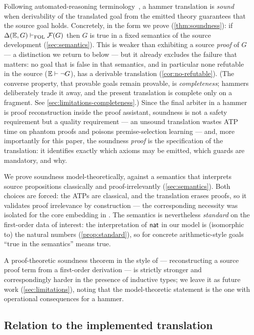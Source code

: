 Following automated-reasoning terminology~\cite{Czajka2018,
BlanchetteEtAl2016}, a hammer translation is \emph{sound} when derivability
of the translated goal from the emitted theory guarantees that the source
goal holds.  Concretely, in the form we prove (\cref{thm:soundness}): if
$\Delta(\mathbb{E},G) \vdash_{\mathrm{FOL}} \mathcal{F}(G)$ then $G$ is true in a fixed semantics of the source
development (\cref{sec:semantics}).  This is weaker than exhibiting a source
\emph{proof} of $G$ --- a distinction we return to below --- but it already
excludes the failure that matters: no goal that is false in that semantics,
and in particular none refutable in the source ($\mathbb{E} \vdash \neg G$), has a
derivable translation (\cref{cor:no-refutable}).  (The converse property,
that provable
goals remain provable, is \emph{completeness}; hammers deliberately trade
it away, and the present translation is complete only on a fragment.  See
\cref{sec:limitations-completeness}.)  Since the final arbiter in a hammer
is proof reconstruction inside the proof assistant, soundness is not a
safety requirement but a quality requirement --- an unsound translation
wastes ATP time on phantom proofs and poisons premise-selection learning
\cite{BlanchetteEtAl2016qed} --- and, more importantly for this paper, the
soundness \emph{proof} is the specification of the translation: it
identifies exactly which axioms may be emitted, which guards are mandatory,
and why.

We prove soundness model-theoretically, against a semantics that interprets
source propositions classically and proof-irrelevantly
(\cref{sec:semantics}).  Both choices are forced: the ATPs are classical,
and the translation erases proofs, so it validates proof irrelevance by
construction --- the corresponding necessity was isolated for the core
embedding in \cite[Example 52]{Czajka2018}.  The semantics is nevertheless
\emph{standard} on the first-order data of interest: the interpretation of
$\mathsf{nat}$ in our model is (isomorphic to) the natural numbers
(\cref{prop:standard}), so for concrete arithmetic-style goals ``true in
the semantics'' means true.

A proof-theoretic soundness theorem in the style of \cite{Czajka2018} ---
reconstructing a source proof term from a first-order derivation --- is
strictly stronger and correspondingly harder in the presence of inductive
types; we leave it as future work (\cref{sec:limitations}), noting that the
model-theoretic statement is the one with operational consequences for a
hammer.

\subsection{Relation to the implemented translation}
\label{sec:intro-impl}

